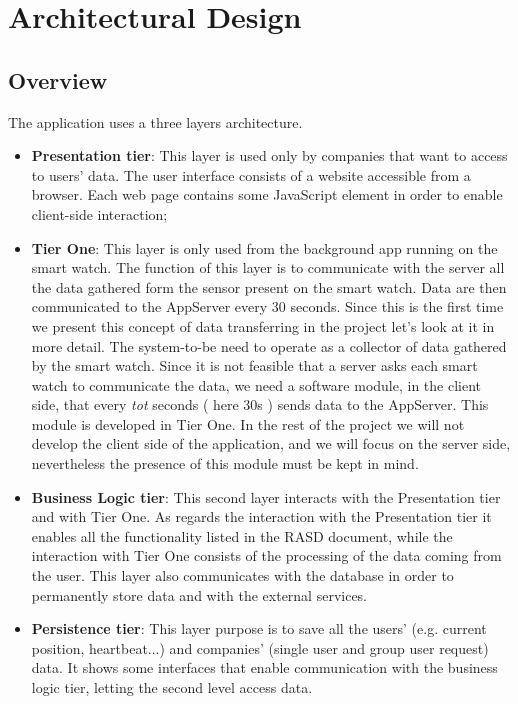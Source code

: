 \documentclass{article}
\begin{document}
\section{Architectural Design}
\subsection{Overview}
The application uses a three layers architecture.
\begin{itemize}
\item \textbf{Presentation tier}: This layer is used only by companies that want to access to users' data. The user interface consists of a website accessible from a browser. Each web page contains some JavaScript element in order to enable client-side interaction;
\item \textbf{Tier One}: This layer is only used from the background app running on the smart watch. The function of this layer is to communicate with the server all the data gathered form the sensor present on the smart watch. Data are then communicated to the AppServer every 30 seconds. Since this is the first time we present this concept of data transferring in the project let's look at it in more detail. The system-to-be need to operate as a collector of data gathered by the smart watch. Since it is not feasible that a server asks each smart watch to communicate the data, we need a software module, in the client side, that every \emph{tot} seconds ( here 30s ) sends data to the AppServer. This module is developed in Tier One. In the rest of the project we will not develop the client side of the application, and we will focus on the server side, nevertheless the presence of this module must be kept in mind.   
\item \textbf{Business Logic tier}: This second layer interacts with the Presentation tier and with Tier One. As regards the interaction with the Presentation tier it enables all the functionality listed in the RASD document, while the interaction with Tier One consists of the processing of the data coming from the user. This layer also communicates with the database in order to permanently store data and with the external services.
\item \textbf{Persistence tier}: This layer purpose is to save all the users' (e.g. current position, heartbeat...) and companies' (single user and group user request) data. It shows some interfaces that enable communication with the business logic tier, letting the second level access data.
\end{itemize}
\end{document}
